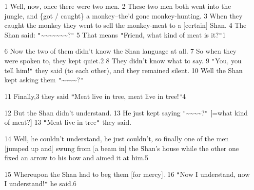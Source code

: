 
1 Well, now, once there were two men. 2 These two men both went into the jungle,
and \{got / caught\} a monkey--the'd gone monkey-hunting. 3 When they caught the
monkey they went to sell the monkey-meat to a [certain] Shan. 4 The Shan said:
\texttt{"}\textasciitilde{}\textasciitilde{}\textasciitilde{}\textasciitilde{}\textasciitilde{}\textasciitilde{}\textasciitilde{}?\texttt{"}
5 That means \texttt{"}Friend, what kind of meat is it?\texttt{"}1

6 Now the two of them didn't know the Shan language at all. 7 So when they were
spoken to, they kept quiet.2 8 They didn't know what to say. 9 \texttt{"}You, you
tell him!\texttt{"} they said (to each other), and they remained silent. 10 Well
the Shan kept asking them \texttt{"}\textasciitilde{}\textasciitilde{}\textasciitilde{}\textasciitilde{}?\texttt{"}

11 Finally,3 they said \texttt{"}Meat live in tree, meat live in tree!\texttt{"}4

12 But the Shan didn't understand. 13 He just kept saying \texttt{"}\textasciitilde{}\textasciitilde{}\textasciitilde{}\textasciitilde{}?\texttt{"}
[=what kind of meat?] 13 \texttt{"}Meat live in tree\texttt{"} they said.

14 Well, he couldn't understand, he just couldn't, so finally one of the men [jumped
up and] swung from [a beam in] the Shan's house while the other one fixed an arrow
to his bow and aimed it at him.5

15 Whereupon the Shan had to beg them [for mercy]. 16 \texttt{"}Now I understand,
now I understand!\texttt{"} he said.6


